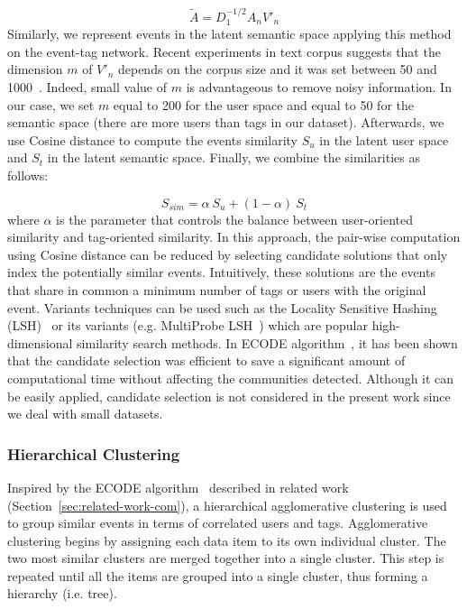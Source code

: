 \begin{equation}  \label{eq:event-latent-1}
\tilde{A}=D_1^{-1/2} A_n V'_n
\end{equation}
Similarly, we represent events in the latent semantic space applying this method on the event-tag network. Recent experiments in text corpus suggests that the dimension $m$ of $V'_n$ depends on the corpus size and it was set between 50 and 1000~\cite{Landauer:2008}. Indeed, small value of $m$ is advantageous to remove noisy information. In our case, we set $m$ equal to 200 for the user space and equal to 50 for the semantic space (there are more users than tags in our dataset). Afterwards, we use Cosine distance to compute the events similarity $S_u$ in the latent user space and $S_t$ in the latent semantic space. Finally, we combine the similarities as follows:

\begin{equation}  \label{eq:event-sim}
S_{sim} =\alpha \ S_u + (1-\alpha) \ S_t
\end{equation}
where $\alpha$ is the parameter that controls the balance between user-oriented similarity and tag-oriented similarity. In this approach, the pair-wise computation using Cosine distance can be reduced by selecting candidate solutions that only index the potentially similar events. Intuitively, these solutions are the events that share in common a minimum number of tags or users with the original event. Variants techniques can be used such as the Locality Sensitive Hashing (LSH)~\cite{Gionis:VLDB99} or its variants (e.g. MultiProbe LSH~\cite{Lv:VLDB07}) which are popular high-dimensional similarity search methods. In ECODE algorithm~\cite{Li:dasfa11a}, it has been shown that the candidate selection was efficient to save a significant amount of computational time without affecting the communities detected. Although it can be easily applied, candidate selection is not considered in the present work since we deal with small datasets.

\subsubsection{Hierarchical Clustering} \label{sec:clustering}
Inspired by the ECODE algorithm~\cite{Li:dasfa11a} described in related work (Section~\ref{sec:related-work-com}), a hierarchical agglomerative clustering is used to group similar events in terms of correlated users and tags. Agglomerative clustering begins by assigning each data item to its own individual cluster. The two most similar clusters are merged together into a single cluster.  This step is repeated until all the items are grouped into a single cluster, thus forming a hierarchy (i.e. tree).

